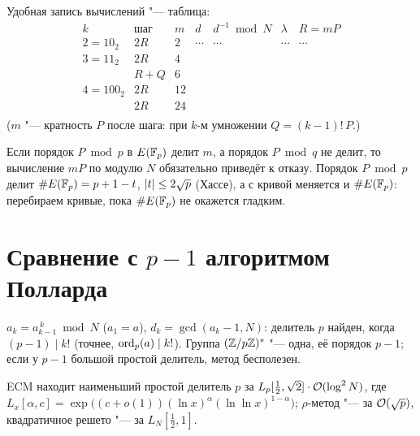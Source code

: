 \documentclass{ca-handout}
\begin{document}
Удобная запись вычислений "--- таблица:
\[
\begin{array}{c|l|r|r|r|r|c}
  k & \text{шаг} & m & d & d^{-1} \bmod N & \lambda & R = mP \\ \hline
  2 = 10_2 & 2R & 2 & \cdots & \cdots & \cdots & \cdots \\ \hline
  3 = 11_2 & 2R & 4 & & & & \\
  & R + Q & 6 & & & & \\ \hline
  4 = 100_2 & 2R & 12 & & & & \\
  & 2R & 24 & & & & \\
\end{array}
\]
($m$ "--- кратность $P$ после шага: при $k$-м умножении $Q = (k - 1)!\,P$.)

\begin{reminder}[title={Почему алгоритм работает}]
Если порядок $P \bmod p$ в $E(\mathbb{F}_p)$ делит $m$, а порядок $P \bmod q$ не делит, то вычисление
$mP$ по модулю $N$ обязательно приведёт к отказу. Порядок $P \bmod p$ делит
$\#E(\mathbb{F}_p) = p + 1 - t$, $\lvert t\rvert \le 2\sqrt p$ (Хассе), а с кривой меняется и $\#E(\mathbb{F}_p)$:
перебираем кривые, пока $\#E(\mathbb{F}_p)$ не окажется гладким.
\end{reminder}

\section{Сравнение с \texorpdfstring{$p - 1$}{p - 1} алгоритмом Полларда}
$a_k = a_{k-1}^{\,k} \bmod N$ ($a_1 = a$), $d_k = \gcd(a_k - 1, N)$: делитель $p$ найден, когда
$(p - 1) \mid k!$ (точнее, $\operatorname{ord}_p(a) \mid k!$). Группа $(\mathbb{Z}/p\mathbb{Z})^{*}$ "--- одна, её порядок $p - 1$;
если у $p - 1$ большой простой делитель, метод бесполезен.

\begin{reminder}[title={Сложность (без доказательства)}]
ECM находит наименьший простой делитель $p$ за $L_p[\frac12, \sqrt 2]\cdot \mathcal{O}(\log^2 N)$,
где $L_x[\alpha, c] = \exp\bigl((c + o(1))(\ln x)^{\alpha} (\ln\ln x)^{1 - \alpha}\bigr)$;
$\rho$-метод "--- за $\mathcal{O}(\sqrt p)$, квадратичное решето "--- за $L_N[\frac12, 1]$.
\end{reminder}
\end{document}
